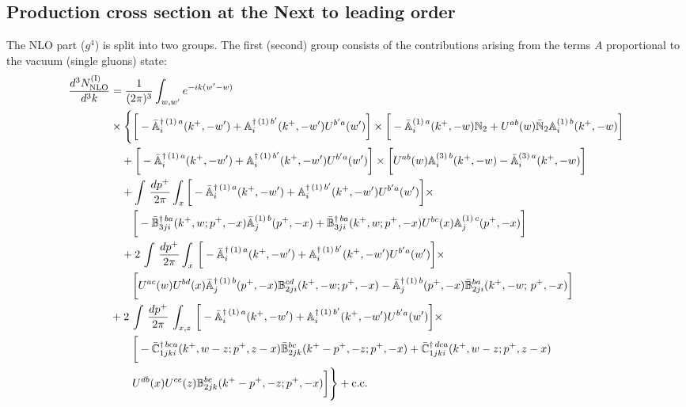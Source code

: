 \documentclass[10pt]{article}
\def\mf#1{\mathbb{#1}}
\numberwithin{equation}{section}
\begin{document}
\subsection{Production cross section at the Next to leading order}
The NLO part ($g^4$) is split into two groups. The first (second) group consists
of the contributions arising from the terms $A$ proportional to the vacuum (single gluons) state: 
\begin{align} \label{eq:CS1}
    \frac{d^{3}N_{\rm NLO}^{\rm (I)}}{d^{3}k} & =
    \frac{1}{(2\pi)^{3}}  \int_{w, w^\prime} e^{-ik(w^\prime-w)}
    \notag \\ & \times \Bigg\{\bigg[-\bar{\mf{A}}^{\dagger\,(1)\,a}_{i}(k^{+},-w^{\prime})+\mf{A}^{\dagger\, (1)\, b^{\prime}}_{i}(k^{+},-w^{\prime})U^{b^{\prime}a}(w^{\prime})\bigg]\times\bigg[-\bar{\mf{A}}^{(1)\,a}_{i}(k^{+},-w)\mf{N}_{2}+ U^{ab}(w)\bar{\mf{N}}_{2}\mf{A}^{(1)\, b}_{i}(k^{+},-w)\bigg]\notag \\ & \quad +\bigg[-\bar{\mf{A}}^{\dagger\,(1)\,a}_{i}(k^{+},-w^{\prime})+\mf{A}^{\dagger\, (1)\, b^{\prime}}_{i}(k^{+},-w^{\prime})U^{b^{\prime}a}(w^{\prime})\bigg]\times\bigg[U^{ab}(w)\mf{A}^{(3)\, b}_{i}(k^{+},- w)-\Bar{\mf{A}}^{(3)\, a}_{i}(k^{+}, - w)\bigg]\notag \\ & \quad +\int\,\frac{dp^{+}}{2\pi} \int_{x} \bigg[-\bar{\mf{A}}^{\dagger\,(1)\,a}_{i}(k^{+},-w^{\prime})+\mf{A}^{\dagger\, (1)\, b^{\prime}}_{i}(k^{+},-w^{\prime})U^{b^{\prime}a}(w^{\prime})\bigg]\times\notag \\ & \quad \quad \bigg[-\Bar{\mf{B}}^{\dagger\, ba}_{3ji}(k^{+}, w; p^{+}, -x)\Bar{\mf{A}}^{(1)\,b}_{j}(p^{+}, - x)
         + \Bar{\mf{B}}^{\dagger\, ba}_{3ji}(k^{+},w; p^{+},-x) U^{bc}(x) \mf{A}^{(1)\, c}_{j}(p^{+},- x)\bigg]\notag \\ & \quad  +2\, \int\,\frac{dp^{+}}{2\pi} \int_{x}\,\bigg[-\bar{\mf{A}}^{\dagger\,(1)\,a}_{i}(k^{+},-w^{\prime})+\mf{A}^{\dagger\, (1)\, b^{\prime}}_{i}(k^{+},-w^{\prime})U^{b^{\prime}a}(w^{\prime})\bigg]\times \notag \\ & \quad \quad \bigg[U^{ac}(w)U^{bd}(x) \bar{\mf{A}}^{\dagger\, (1)\, b}_{j}(p^+,- x) {\mf{B}}^{cd}_{2ji} (k^+, -w;p^+, -x) - \Bar{\mf{A}}^{\dagger\, (1)\, b}_{j}(p^{+}, -x)\Bar{\mf{B}}^{ba}_{2ji}(k^{+},-w;\,p^{+}, -x) \bigg] \notag \\ &+  2\, \int\, \frac{dp^{+}}{2\pi}\,\int_{x,z}\, \bigg[-\bar{\mf{A}}^{\dagger\,(1)\,a}_{i}(k^{+},-w^{\prime})+\mf{A}^{\dagger\, (1)\, b^{\prime}}_{i}(k^{+},-w^{\prime})U^{b^{\prime}a}(w^{\prime})\bigg]\times\notag \\ & \quad \quad \bigg[-\Bar{\mf{C}}^{\dagger\, bca}_{1jki}(k^{+},w-z;p^{+},z-x)\Bar{\mf{B}}^{bc}_{2jk}(k^{+}-p^{+},- z;p^{+},-x)
           +\bar{\mf{C}}^{\dagger\, dca}_{1jki}(k^+,w-z; p^+, z-x)  \notag \\ &\quad \quad
                 U^{db}(x)
                 U^{ce}(z) 
                {\mf{B}}^{be}_{2jk} (k^{+}-p^+, -z; p^+, -x) \bigg]  \Bigg\}+ {\rm c.c.}
\end{align}
\end{document}
